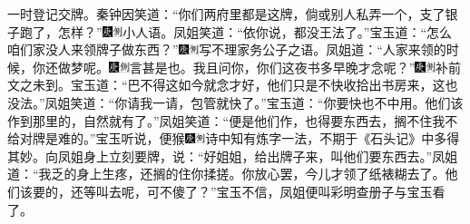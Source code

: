 一时登记交牌。秦钟因笑道：“你们两府里都是这牌，倘或别人私弄一个，支了银子跑了，怎样？”{\includegraphics[width=3mm]{../Images/00004}\includegraphics[width=3mm]{../Images/00011}\footnotesize \kaishu 小人语。}凤姐笑道：“依你说，都没王法了。”宝玉道：“怎么咱们家没人来领牌子做东西？”{\includegraphics[width=3mm]{../Images/00004}\includegraphics[width=3mm]{../Images/00011}\footnotesize \kaishu 写不理家务公子之语。}凤姐道：“人家来领的时候，你还做梦呢。{\includegraphics[width=3mm]{../Images/00004}\includegraphics[width=3mm]{../Images/00011}\footnotesize \kaishu 言甚是也。}我且问你，你们这夜书多早晚才念呢？”{\includegraphics[width=3mm]{../Images/00004}\includegraphics[width=3mm]{../Images/00011}\footnotesize \kaishu 补前文之未到。}宝玉道：“巴不得这如今就念才好，他们只是不快收拾出书房来，这也没法。”凤姐笑道：“你请我一请，包管就快了。”宝玉道：“你要快也不中用。他们该作到那里的，自然就有了。”凤姐笑道：“便是他们作，也得要东西去，搁不住我不给对牌是难的。”宝玉听说，便猴{\includegraphics[width=3mm]{../Images/00004}\includegraphics[width=3mm]{../Images/00011}\footnotesize \kaishu 诗中知有炼字一法，不期于《石头记》中多得其妙。}向凤姐身上立刻要牌，说：“好姐姐，给出牌子来，叫他们要东西去。”凤姐道：“我乏的身上生疼，还搁的住你揉搓。你放心罢，今儿才领了纸裱糊去了。他们该要的，还等叫去呢，可不傻了？”宝玉不信，凤姐便叫彩明查册子与宝玉看了。

